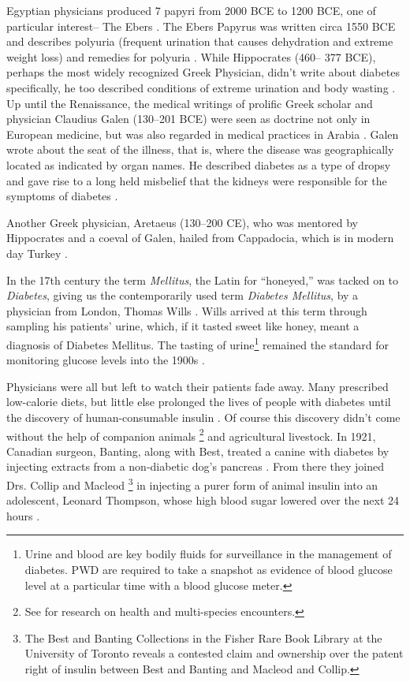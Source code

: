 \documentclass[12pt]{article}
\begin{document}
Egyptian physicians produced 7 papyri from 2000 BCE to 1200 BCE, one of particular interest-- The Ebers \citep{bryan_1974_ancient}. The Ebers Papyrus was written circa 1550 BCE and describes polyuria (frequent urination that causes dehydration and extreme weight loss) and remedies for polyuria \citep{bryan_1974_ancient}. 
While Hippocrates (460-- 377 BCE), perhaps the most widely recognized Greek Physician, didn't write about diabetes specifically, he too described conditions of extreme urination and body wasting \citep{avicenna_1930_treatise}. 
Up until the Renaissance, the medical writings of prolific Greek scholar and physician Claudius Galen (130--201 BCE) were seen as doctrine not only in European medicine, but was also regarded in medical practices in Arabia \citep{henschen_1969_term}. Galen wrote about the seat of the illness, that is, where the disease was geographically located as indicated by organ names. He described diabetes as a type of dropsy and gave rise to a long held misbelief that the kidneys were responsible for the symptoms of diabetes \citep{henschen_1969_term}.

Another Greek physician, Aretaeus (130--200 CE), who was mentored by Hippocrates and a coeval of Galen, hailed from Cappadocia, which is in modern day Turkey \citep{henschen_1969_term}. 


In the 17th century the term \textit{Mellitus}, the Latin for ``honeyed,'' was tacked on to \textit{Diabetes}, giving us the contemporarily used term \textit{Diabetes Mellitus}, by a physician from London, Thomas Wills \citep{sattley_history_1996}. Wills arrived at this term through sampling his patients' urine, which, if it tasted sweet like honey, meant a diagnosis of Diabetes Mellitus. The tasting of urine\footnote{Urine and blood are key bodily fluids for surveillance in the management of diabetes. PWD are required to take a snapshot as evidence of blood glucose level at a particular time with a blood glucose meter.} remained the standard for monitoring glucose levels into the 1900s \citep{sattley_history_1996}. 

Physicians were all but left to watch their patients fade away. Many prescribed low-calorie diets, but little else prolonged the lives of people with diabetes until the discovery of human-consumable insulin \citep{ebstein_history_1989}. Of course this discovery didn't come without the help of companion animals \citep{balfe_diabetes_2008}\footnote{See \citet{wilkie_multispecies_2013} for research on health and multi-species encounters.} and agricultural livestock. In 1921, Canadian surgeon, Banting, along with Best, treated a canine with diabetes by injecting extracts from a non-diabetic dog's pancreas \citep{zimmermann_first_1989}. From there they joined Drs. Collip and Macleod \footnote{The Best and Banting Collections in the Fisher Rare Book Library at the University of Toronto reveals a contested claim and ownership over the patent right of insulin between Best and Banting and Macleod and Collip.} in injecting a purer form of animal insulin into an adolescent, Leonard Thompson, whose high blood sugar lowered over the next 24 hours \citep{sattley_history_1996}.  
\end{document}
